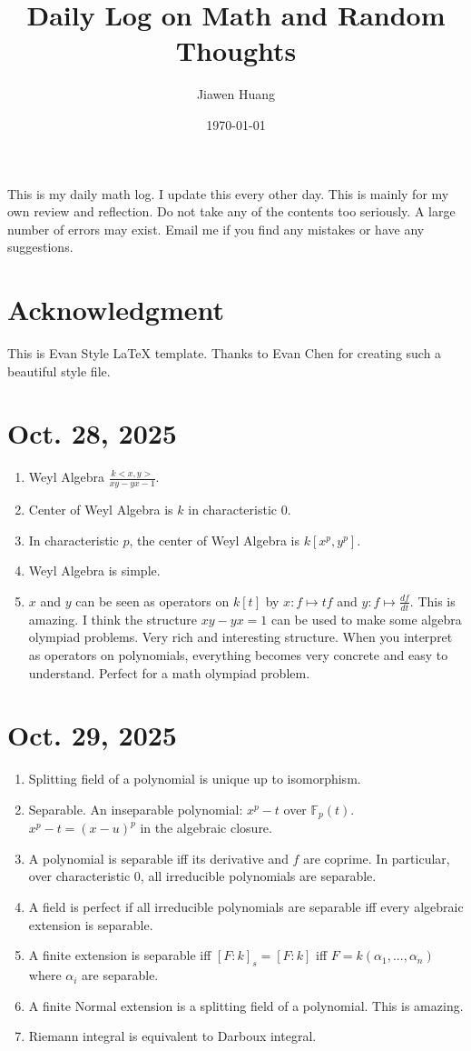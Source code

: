 \documentclass[15pt]{scrartcl}
\begin{document}
\title{Daily Log on Math and Random Thoughts}
\date{\today}
\author{Jiawen Huang}
\maketitle
This is my daily math log. I update this every other day. This is mainly for my own review and reflection. Do not take any of the contents too seriously. A large number of errors may exist. Email me if you find any mistakes or have any suggestions. 

\newpage
\tableofcontents
\newpage

\section{Acknowledgment}
This is Evan Style LaTeX template. Thanks to Evan Chen for creating such a beautiful style file.
\newpage 
\section{Oct. 28, 2025}
\begin{enumerate}
\item Weyl Algebra $\frac{k<x,y>}{xy-yx-1}$. 
\item Center of Weyl Algebra is $k$ in characteristic 0.
\item In characteristic $p$, the center of Weyl Algebra is $k[x^p,y^p]$.
\item Weyl Algebra is simple.
\item $x$ and $y$ can be seen as operators on $k[t]$ by $x:f\mapsto tf$ and $y:f\mapsto \frac{df}{dt}$. This is amazing. 
I think the structure $xy-yx=1$ can be used to make some algebra olympiad problems. Very rich and interesting structure. 
When you interpret as operators on polynomials, everything becomes very concrete and easy to understand. Perfect for a math olympiad problem.

\end{enumerate}

\section{Oct. 29, 2025}
\begin{enumerate}
\item Splitting field of a polynomial is unique up to isomorphism.
\item Separable. An inseparable polynomial: $x^p-t$ over $\mathbb{F}_p(t)$. $x^p-t=(x-u)^p$ in the algebraic closure. 
\item A polynomial is separable iff its derivative and $f$ are coprime. In particular, over characteristic 0, all irreducible polynomials are separable.
\item A field is perfect if all irreducible polynomials are separable iff every algebraic extension is separable. 
\item A finite extension is separable iff $[F:k]_s=[F:k]$ iff $F=k(\alpha_1,...,\alpha_n)$ where $\alpha_i$ are separable.
\item A finite Normal extension is a splitting field of a polynomial. This is amazing. 
\item Riemann integral is equivalent to Darboux integral.
\end{enumerate}
\end{document}
